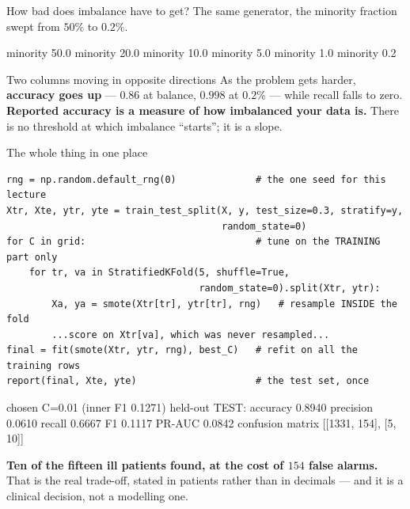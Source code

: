 \documentclass[aspectratio=169]{beamer}
\begin{document}
\begin{frame}[fragile,shrink=8]{How bad does imbalance have to get?}
The same generator, the minority fraction swept from $50\%$ to $0.2\%$.
\begin{outblk}
   minority  50.0%
   minority  20.0%
   minority  10.0%
   minority   5.0%
   minority   1.0%
   minority   0.2%
\end{outblk}
\begin{alertblock}{Two columns moving in opposite directions}
  \footnotesize As the problem gets harder, \textbf{accuracy goes up} ---
  $0.86$ at balance, $0.998$ at $0.2\%$ --- while recall falls to zero.
  \textbf{Reported accuracy is a measure of how imbalanced your data is.}
  There is no threshold at which imbalance ``starts''; it is a slope.
\end{alertblock}
\end{frame}

\begin{frame}[fragile,shrink=6]{The whole thing in one place}
\begin{lstlisting}
rng = np.random.default_rng(0)              # the one seed for this lecture
Xtr, Xte, ytr, yte = train_test_split(X, y, test_size=0.3, stratify=y,
                                      random_state=0)
for C in grid:                              # tune on the TRAINING part only
    for tr, va in StratifiedKFold(5, shuffle=True,
                                  random_state=0).split(Xtr, ytr):
        Xa, ya = smote(Xtr[tr], ytr[tr], rng)   # resample INSIDE the fold
        ...score on Xtr[va], which was never resampled...
final = fit(smote(Xtr, ytr, rng), best_C)   # refit on all the training rows
report(final, Xte, yte)                     # the test set, once
\end{lstlisting}
\begin{outblk}
   chosen C=0.01 (inner F1 0.1271)
   held-out TEST: accuracy 0.8940  precision 0.0610  recall 0.6667  F1 0.1117  PR-AUC 0.0842
   confusion matrix [[1331, 154], [5, 10]]
\end{outblk}
\begin{center}\small
  \textbf{Ten of the fifteen ill patients found, at the cost of $154$ false
  alarms.} That is the real trade-off, stated in patients rather than in
  decimals --- and it is a clinical decision, not a modelling one.
\end{center}
\end{frame}
\end{document}
